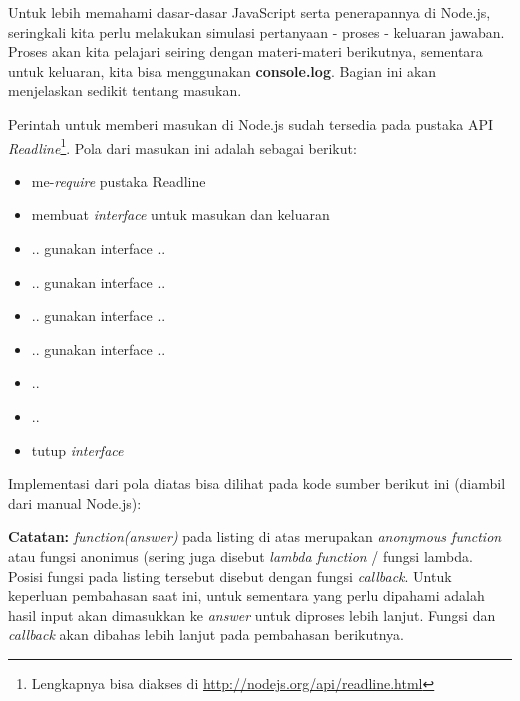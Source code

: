 Untuk lebih memahami dasar-dasar JavaScript serta penerapannya di Node.js, seringkali kita perlu melakukan simulasi pertanyaan - proses - keluaran jawaban. Proses akan kita pelajari seiring dengan materi-materi berikutnya, sementara untuk keluaran, kita bisa menggunakan \textbf{console.log}. Bagian ini akan menjelaskan sedikit tentang masukan.

Perintah untuk memberi masukan di Node.js sudah tersedia pada pustaka API \textit{Readline}\footnote{Lengkapnya bisa diakses di \url{http://nodejs.org/api/readline.html}}. Pola dari masukan ini adalah sebagai berikut:
\begin{itemize}
  \item me-\textit{require} pustaka Readline
  \item membuat \textit{interface} untuk masukan dan keluaran
  \item .. gunakan interface ..
  \item .. gunakan interface ..
  \item .. gunakan interface ..
  \item .. gunakan interface ..
  \item ..
  \item ..
  \item tutup \textit{interface}
\end{itemize}

Implementasi dari pola diatas bisa dilihat pada kode sumber berikut ini (diambil dari manual Node.js):

\lstset{language=JavaScript,caption=readline.js: penggunaan pustaka Readline untuk masukan}


\begin{Sbox}
\begin{minipage}{\textwidth}
\textbf{Catatan:} \textit{function(answer)} pada listing di atas merupakan \textit{anonymous function} atau fungsi anonimus (sering juga disebut \textit{lambda function} / fungsi lambda. Posisi fungsi pada listing tersebut disebut dengan fungsi \textit{callback}. Untuk keperluan pembahasan saat ini, untuk sementara yang perlu dipahami adalah hasil input akan dimasukkan ke \textit{answer} untuk diproses lebih lanjut. Fungsi dan \textit{callback} akan dibahas lebih lanjut pada pembahasan berikutnya.
\end{minipage}
\end{Sbox}
\begin{center}
\shadowbox{\TheSbox}
\end{center}

